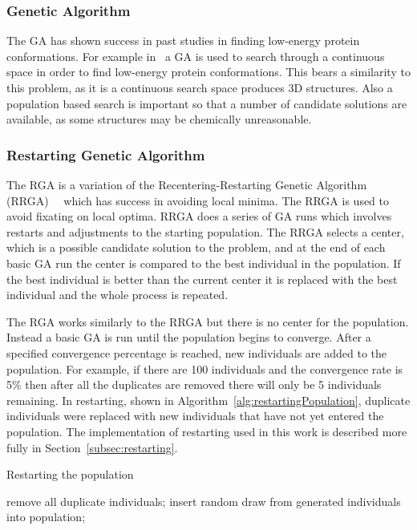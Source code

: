 \documentclass[conference]{IEEEtran}
\begin{document}
\subsubsection{Genetic Algorithm}

The GA has shown success in past studies in finding low-energy protein conformations. For example in~\cite{comte2010bioinspired} a GA is used to search through a continuous space in order to find low-energy protein conformations. This bears a similarity to this problem, as it is a continuous search space produces 3D structures. Also a population based search is important so that a number of candidate solutions are available, as some structures may be chemically unreasonable.

\subsubsection{Restarting Genetic Algorithm}

The RGA is a variation of the Recentering-Restarting Genetic Algorithm (RRGA)~\cite{hughes2013recentering}~\cite{hughes2013edit} which has success in avoiding local minima. The RRGA is used to avoid fixating on local optima. RRGA does a series of GA runs which involves restarts and adjustments to the starting population. The RRGA selects a center, which is a possible candidate solution to the problem, and at the end of each basic GA run the center is compared to the best individual in the population. If the best individual is better than the current center it is replaced with the best individual and the whole process is repeated.

The RGA works similarly to the RRGA but there is no center for the population. Instead a basic GA is run until the population begins to converge. After a specified convergence percentage is reached, new individuals are added to the population. For example, if there are 100 individuals and the convergence rate is 5\% then after all the duplicates are removed there will only be 5 individuals remaining. In restarting, shown in Algorithm~\ref{alg:restartingPopulation}, duplicate individuals were replaced with new individuals that have not yet entered the population. The implementation of restarting used in this work is described more fully in Section~\ref{subsec:restarting}.

\begin{algorithm}
\caption{Restarting the population}
\label{alg:restartingPopulation}
\begin{algorithmic}

  \STATE remove all duplicate individuals;
    \STATE insert random draw from generated individuals into population;
  \ENDWHILE
\ENDIF

\end{algorithmic}
\end{algorithm}
\end{document}
